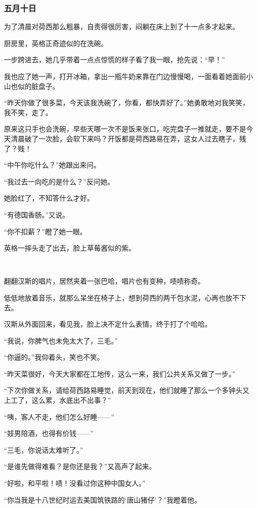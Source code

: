 \subsubsection{五月十日}
\par 为了清晨对荷西那么粗暴，自责得很厉害，闷躺在床上到了十一点多才起来。
\par 厨房里，英格正奇迹似的在洗碗。
\par 一步跨进去，她几乎带着一点点惊慌的样子看了我一眼，抢先说：“早！”
\par 我也应了她一声，打开冰箱，拿出一瓶牛奶来靠在门边慢慢喝，一面看着她面前小山也似的脏盘子。
\par “昨天你做了很多菜，今天该我洗碗了，你看，都快弄好了。”她勇敢地对我笑笑，我不笑，走了。
\par 原来这只手也会洗碗，早些天哪一次不是饭来张口，吃完盘子一推就走，要不是今天清晨破了一次脸，会软下来吗？开饭都是荷西路易在弄，这女人过去瞎子，残了？贱！
\par “中午你吃什么？”她跟出来问。
\par “我过去一向吃的是什么？”反问她。
\par 她脸红了，不知答什么才好。
\par “有德国香肠。”又说。
\par “你不扣薪？”瞪了她一眼。
\par 英格一摔头走了出去，脸上草莓酱似的紫。
\par  
\par 翻翻汉斯的唱片，居然夹着一张巴哈，唱片也有变种，啧啧称奇。
\par 低低地放着音乐，就那么呆坐在椅子上，想到荷西的两千包水泥，心再也放不下去。
\par 汉斯从外面回来，看见我，脸上决不定什么表情，终于打了个哈哈。
\par “我说，你脾气也未免太大了，三毛。”
\par “你逼的。”我仰着头，笑也不笑。
\par “昨天菜很好，今天大家都在工地传，这么一来，我们公共关系又做了一步。”
\par “下次你做关系，请给荷西路易睡觉，前天到现在，他们就睡了那么一个多钟头又上工了，这么累，水底出不出事？”
\par “咦，客人不走，他们怎么好睡——”
\par “妓男陪酒，也得有价钱——”
\par “三毛，你说话太难听了。”
\par “是谁先做得难看？是你还是我？”又高声了起来。
\par “好啦，和平啦！啧！没看过你这种中国女人。”
\par “你当我是十八世纪时运去美国筑铁路的‘唐山猪仔’？”我瞪着他。
